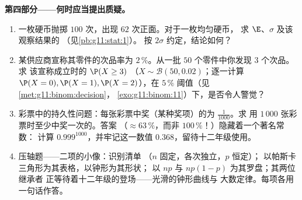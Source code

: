 \begin{problem}
\medskip
\noindent\textbf{第四部分——何时应当提出质疑。}
\begin{enumerate}[resume]
  \item 一枚硬币抛掷 $100$ 次，出现 $62$ 次正面。对于一枚均匀硬币，
        求 $\E$、$\sigma$ 及该观察结果的
        （见\cref{pb:g11:stat:1}）。
        按 $2\sigma$ 约定，结论如何？
  \item 某供应商宣称其零件的次品率为 $2\,\%$。从一批
        $50$ 个零件中你发现 $3$ 个次品。求
        该宣称成立时的 $\P(X \geq 3)$
        （$X \sim \mathcal B(50, 0.02)$；逐一计算
        $\P(X = 0), \P(X = 1), \P(X = 2)$），在
        $5\,\%$ 阈值（见\cref{met:g11:binom:decision}，
        \cref{exo:g11:binom:11}）下，是否令人警觉？
  \item 彩票中的持久性问题：每张彩票中奖（某种奖项）的为
        $\frac{1}{1000}$。求
        用 $1\,000$ 张彩票时至少中奖一次的。答案
        （$\approx 63\,\%$，而非 $100\,\%$！）隐藏着一个著名常数：
        计算 $0.999^{1000}$，并牢记这一数值
        $0.368$，留待十二年级使用。
  \item 压轴题——二项的小像：识别清单
        （$n$ 固定，各次独立，$p$ 恒定）；
        以帕斯卡三角形为其表格，以钟形为其形状；
        以 $np$ 与 $np(1-p)$ 为其罗盘；其两位继承者
        正等待着十二年级的登场——光滑的钟形曲线与
        大数定律。每项各用一句话作答。
\end{enumerate}
\end{problem}

